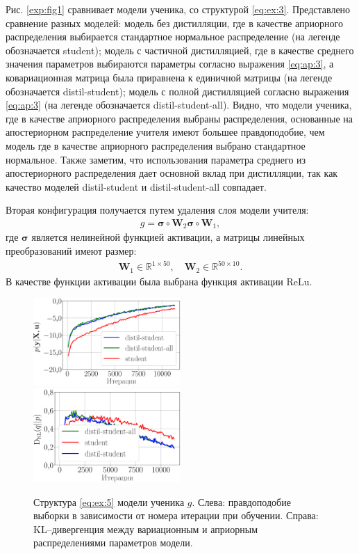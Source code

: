 Рис. \ref{exp:fig1} сравнивает модели ученика, со структурой \eqref{eq:ex:3}. Представлено сравнение разных моделей: модель без дистилляции, где в качестве априорного распределения выбирается стандартное нормальное распределение (на легенде обозначается student); модель с частичной дистилляцией, где в качестве среднего значения параметров выбираются параметры согласно выражения \eqref{eq:ap:3}, а ковариационная матрица была приравнена к единичной матрицы (на легенде обозначается distil-student); модель с полной дистилляцией согласно выражения \eqref{eq:ap:3} (на легенде обозначается distil-student-all). Видно, что модели ученика, где в качестве априорного распределения выбраны распределения, основанные на апостериорном распределение учителя имеют большее правдоподобие, чем модель где в качестве априорного распределения выбрано стандартное нормальное. Также заметим, что использования параметра среднего из апостериорного распределения дает основной вклад при дистилляции, так как качество моделей distil-student и distil-student-all совпадает.

Вторая конфигурация получается путем удаления слоя модели учителя:
\[
\label{eq:ex:5}
\begin{aligned}
g = \bm{\sigma} \circ \mathbf{W}_2\bm{\sigma} \circ \mathbf{W}_1,
\end{aligned}
\]
где $\bm{\sigma}$ является нелинейной функцией активации, а матрицы линейных преобразований имеют размер:
\[
\label{eq:ex:6}
\begin{aligned}
\mathbf{W}_{1} \in \mathbb{R}^{1 \times 50}, \quad \mathbf{W}_{2} \in \mathbb{R}^{50 \times 10}.
\end{aligned}
\]
 В качестве функции активации была выбрана функция активации $\text{ReLu}$.

\begin{figure}[h!]
\includegraphics[width=0.5\textwidth]{results/bayesdistil/synthetic_likelihood_2_layers.eps}
\includegraphics[width=0.5\textwidth]{results/bayesdistil/synthetic_D_KL_2_layers.eps}
\caption{Структура \eqref{eq:ex:5} модели ученика $g$. Слева: правдоподобие выборки в зависимости от номера итерации при обучении. Справа: KL--дивергенция между вариационным и априорным распределениями параметров модели.}
\label{exp:fig2}
\end{figure}

